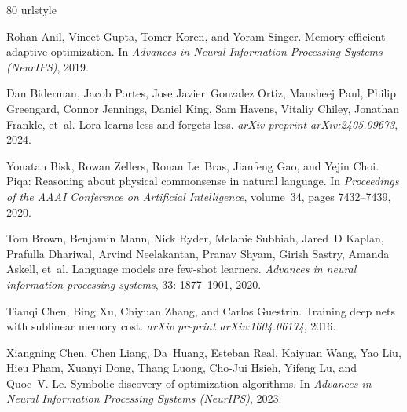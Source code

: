 \documentclass[10pt,twocolumn,letterpaper]{article}
\theoremstyle{plain}
\theoremstyle{definition}
\theoremstyle{remark}
\begin{document}
{\small
\begin{thebibliography}{80}
\providecommand{\natexlab}[1]{#1}
\providecommand{\url}[1]{\texttt{#1}}
\expandafter\ifx\csname urlstyle\endcsname\relax
  \providecommand{\doi}[1]{doi: #1}\else
  \providecommand{\doi}{doi: \begingroup \urlstyle{rm}\Url}\fi

Rohan Anil, Vineet Gupta, Tomer Koren, and Yoram Singer.
\newblock Memory-efficient adaptive optimization.
\newblock In \emph{Advances in Neural Information Processing Systems
  (NeurIPS)}, 2019.

Dan Biderman, Jacob Portes, Jose Javier~Gonzalez Ortiz, Mansheej Paul, Philip
  Greengard, Connor Jennings, Daniel King, Sam Havens, Vitaliy Chiley, Jonathan
  Frankle, et~al.
\newblock Lora learns less and forgets less.
\newblock \emph{arXiv preprint arXiv:2405.09673}, 2024.

Yonatan Bisk, Rowan Zellers, Ronan Le~Bras, Jianfeng Gao, and Yejin Choi.
\newblock Piqa: Reasoning about physical commonsense in natural language.
\newblock In \emph{Proceedings of the AAAI Conference on Artificial
  Intelligence}, volume~34, pages 7432--7439, 2020.

Tom Brown, Benjamin Mann, Nick Ryder, Melanie Subbiah, Jared~D Kaplan, Prafulla
  Dhariwal, Arvind Neelakantan, Pranav Shyam, Girish Sastry, Amanda Askell,
  et~al.
\newblock Language models are few-shot learners.
\newblock \emph{Advances in neural information processing systems},
  33: 1877--1901, 2020.

Tianqi Chen, Bing Xu, Chiyuan Zhang, and Carlos Guestrin.
\newblock Training deep nets with sublinear memory cost.
\newblock \emph{arXiv preprint arXiv:1604.06174}, 2016.

Xiangning Chen, Chen Liang, Da~Huang, Esteban Real, Kaiyuan Wang, Yao Liu, Hieu
  Pham, Xuanyi Dong, Thang Luong, Cho-Jui Hsieh, Yifeng Lu, and Quoc~V. Le.
\newblock Symbolic discovery of optimization algorithms.
\newblock In \emph{Advances in Neural Information Processing Systems
  (NeurIPS)}, 2023.


\end{thebibliography}}
\end{document}
